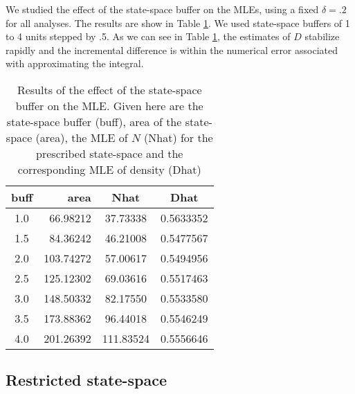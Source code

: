 {We studied the effect of the state-space buffer on the MLEs,
using a fixed $\delta = .2$ for all analyses. The results are show in Table \ref{mle.tab.buff}. 
We used state-space buffers
of 1 to 4 units stepped by .5. As we can see in Table \ref{mle.tab.buff}, 
the estimates of $D$ stabilize rapidly and the incremental difference
is within the numerical error associated with approximating the
integral.  

\begin{table}[ht]
\centering
\caption{Results of the effect of the state-space buffer on the MLE. 
Given here are the state-space buffer (buff), area of the state-space (area), the
MLE of $N$ (Nhat) for the prescribed state-space and the corresponding MLE of
density (Dhat)}
\begin{tabular}{crcc}
\hline \hline
buff    & area & Nhat & Dhat \\ \hline
 1.0 & 66.98212 & 37.73338 & 0.5633352  \\
 1.5 & 84.36242 & 46.21008 & 0.5477567  \\
 2.0 &103.74272 & 57.00617 & 0.5494956  \\
 2.5 &125.12302 & 69.03616 & 0.5517463  \\
 3.0 &148.50332 & 82.17550 & 0.5533580  \\ 
 3.5 &173.88362 & 96.44018 & 0.5546249  \\
 4.0 &201.26392 &111.83524 & 0.5556646  \\  \hline
\end{tabular}
\label{mle.tab.buff}
\end{table}


\subsection{Restricted state-space}
\label{mle.sec.shapefile}

}
